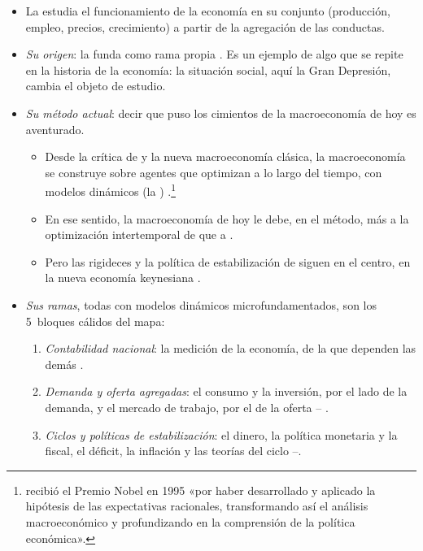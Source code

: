 \documentclass[11pt]{article}
\begin{document}
\begin{itemize}
\item La  estudia el funcionamiento de la economía en su conjunto (producción, empleo, precios, crecimiento) a partir de la agregación de las conductas.
\item \emph{Su origen}:  la funda como rama propia\nocite{Keynes1936,DeVroey2016History} . Es un ejemplo de algo que se repite en la historia de la economía: la situación social, aquí la Gran Depresión, cambia el objeto de estudio.
\item \emph{Su método actual}: decir que  puso los cimientos de la macroeconomía de hoy es aventurado.
  \begin{itemize}
  \item Desde la crítica de  y la nueva macroeconomía clásica, la macroeconomía se construye sobre agentes que optimizan a lo largo del tiempo, con modelos dinámicos (la ) .\footnote{ recibió el Premio Nobel en 1995 «por haber desarrollado y aplicado la hipótesis de las expectativas racionales, transformando así el análisis macroeconómico y profundizando en la comprensión de la política económica»\nocite{NobelPrize1995Lucas}.}
  \item En ese sentido, la macroeconomía de hoy le debe, en el método, más a la optimización intertemporal de  que a  .
  \item Pero las rigideces y la política de estabilización de  siguen en el centro, en la nueva economía keynesiana .
  \end{itemize}
\item \emph{Sus ramas}, todas con modelos dinámicos microfundamentados, son los 5~bloques cálidos del mapa:
  \begin{enumerate}
  \item \emph{Contabilidad nacional}: la medición de la economía, de la que dependen las demás   .
  \item \emph{Demanda y oferta agregadas}: el consumo y la inversión, por el lado de la demanda, y el mercado de trabajo, por el de la oferta --  .
  \item \emph{Ciclos y políticas de estabilización}: el dinero, la política monetaria y la fiscal, el déficit, la inflación y las teorías del ciclo --.

\end{enumerate}
\end{itemize}
\end{document}
